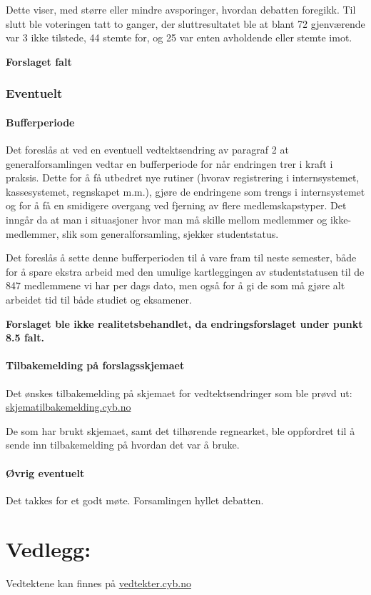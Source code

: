 \documentclass[10pt,norsk,a4paper,usenames,dvipsnames]{article}
\begin{document}
        Dette viser, med større eller mindre avsporinger, hvordan debatten foregikk. Til slutt ble voteringen tatt to ganger, der sluttresultatet ble at blant 72 gjenværende var 3 ikke tilstede, 44 stemte for, og 25 var enten avholdende eller stemte imot.
        
        \textbf{Forslaget falt}
        

\section{Eventuelt}
    \subsection{Bufferperiode}
        Det foreslås at ved en eventuell vedtektsendring av paragraf 2 at generalforsamlingen vedtar en bufferperiode for når endringen trer i kraft i praksis. Dette for å få utbedret nye rutiner (hvorav registrering i internsystemet, kassesystemet, regnskapet m.m.), gjøre de endringene som trengs i internsystemet og for å få en smidigere overgang ved fjerning av flere medlemskapstyper. Det inngår da at man i situasjoner hvor man må skille mellom medlemmer og ikke-medlemmer, slik som generalforsamling, sjekker studentstatus.
        
        Det foreslås å sette denne bufferperioden til å vare fram til neste semester, både for å spare ekstra arbeid med den umulige kartleggingen av studentstatusen til de 847 medlemmene vi har per dags dato, men også for å gi de som må gjøre alt arbeidet tid til både studiet og eksamener.
        
        \textbf{Forslaget ble ikke realitetsbehandlet, da endringsforslaget under punkt 8.5 falt.}
    
    \subsection{Tilbakemelding på forslagsskjemaet}
        Det ønskes tilbakemelding på skjemaet for vedtektsendringer som ble prøvd ut:
        \href{skjematilbakemelding.cyb.no}{skjematilbakemelding.cyb.no}
        
        De som har brukt skjemaet, samt det tilhørende regnearket, ble oppfordret til å sende inn tilbakemelding på hvordan det var å bruke.
    
    \subsection{Øvrig eventuelt}
    Det takkes for et godt møte. Forsamlingen hyllet debatten.


\part*{Vedlegg:}\label{lastpage}

    \centering\huge Vedtektene kan finnes på \href{vedtekter.cyb.no}{vedtekter.cyb.no}
    

% 
\end{document}
